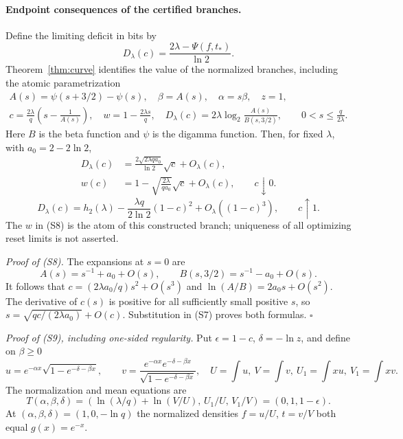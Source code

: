 \documentclass[11pt]{article}
\begin{document}
\paragraph{Endpoint consequences of the certified branches.}
Define the limiting deficit in bits by
\[
 D_\lambda(c)=\frac{2\lambda-\Psi(f,t_*)}{\ln2}.
\]
Theorem~\ref{thm:curve} identifies the value of the normalized branches, including the atomic parametrization
\[
\begin{gathered}
 A(s)=\psi(s+3/2)-\psi(s),\quad
 \beta=A(s),\quad\alpha=s\beta,\quad z=1,\\
 c=\frac{2\lambda}{q}\left(s-\frac1{A(s)}\right),\quad
 w=1-\frac{2\lambda s}{q},\quad
 D_\lambda(c)=2\lambda\log_2\frac{A(s)}{B(s,3/2)},
 \qquad 0<s\le\frac{q}{2\lambda}.                              \tag{S7}
\end{gathered}
\]
Here \(B\) is the beta function and \(\psi\) is the digamma function.
Then, for fixed \(\lambda\), with \(a_0=2-2\ln2\),
\[
 \begin{aligned}
 D_\lambda(c)&=\frac{2\sqrt{2\lambda q a_0}}{\ln2}\sqrt c
                      +O_\lambda(c),\\
 w(c)&=1-\sqrt{\frac{2\lambda}{q a_0}}\sqrt c+O_\lambda(c),
                  \qquad c\downarrow0.
 \end{aligned}                                                \tag{S8}
\]
\[
 D_\lambda(c)=h_2(\lambda)
       -\frac{\lambda q}{2\ln2}(1-c)^2
       +O_\lambda((1-c)^3),\qquad c\uparrow1.                 \tag{S9}
\]
The \(w\) in (S8) is the atom of this constructed branch; uniqueness
of all optimizing reset limits is not asserted.

\emph{Proof of (S8).}
The expansions at \(s=0\) are
\[
 A(s)=s^{-1}+a_0+O(s),\qquad B(s,3/2)=s^{-1}-a_0+O(s).
\]
It follows that
\(c=(2\lambda a_0/q)s^2+O(s^3)\) and
\(\ln(A/B)=2a_0s+O(s^2)\).
The derivative of \(c(s)\) is positive for all sufficiently small
positive \(s\), so
\(s=\sqrt{qc/(2\lambda a_0)}+O(c)\).
Substitution in (S7) proves both formulas. \(\square\)

\emph{Proof of (S9), including one-sided regularity.}
Put \(\epsilon=1-c\), \(\delta=-\ln z\), and define on \(\beta\ge0\)
\[
 u=e^{-\alpha x}\sqrt{1-e^{-\delta-\beta x}},\qquad
 v=\frac{e^{-\alpha x}e^{-\delta-\beta x}}
                         {\sqrt{1-e^{-\delta-\beta x}}},
 \quad U=\int u,\ V=\int v,\ U_1=\int xu,\ V_1=\int xv .
\]
The normalization and mean equations are
\[
 T(\alpha,\beta,\delta)
 =\left(\ln(\lambda/q)+\ln(V/U),\, U_1/U,\,V_1/V\right)
 =(0,1,1-\epsilon).                                           \tag{S10}
\]
At \((\alpha,\beta,\delta)=(1,0,-\ln q)\) the normalized densities
\(f=u/U\), \(t=v/V\) both equal \(g(x)=e^{-x}\).
\end{document}
